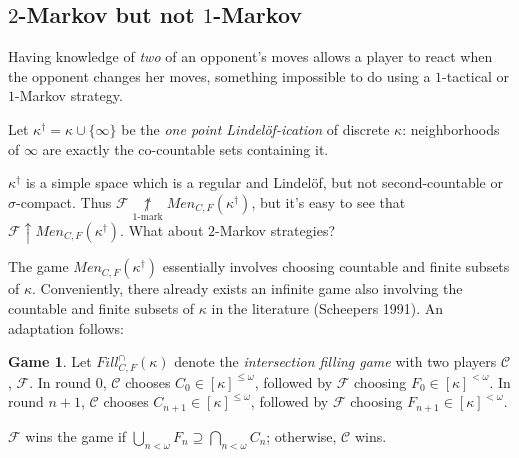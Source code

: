 \documentclass{beamer}
\theoremstyle{definition}
\newtheorem{game}[theorem]{Game}
\newcommand{\win}{\uparrow}
\newcommand{\notkmarkwin}[1]{\underset{#1\text{-mark}}{\not\uparrow}}
\newcommand{\oneptlind}[1]{#1^\dagger}
\newcommand{\mengame}[1]{Men_{C,F}(#1)}
\newcommand{\fillgameInt}[1]{Fill^{\cap}_{C,F}(#1)}
\newcommand{\<}{\langle}
\renewcommand{\>}{\rangle}
\newcommand{\pl}[1]{\mathscr{#1}}
\newcommand{\term}{\textit}
\begin{document}
\subsection{$2$-Markov but not $1$-Markov}

\begin{frame}
  Having knowledge of \textit{two} of an opponent's moves allows a player to
  react when the opponent changes her moves, something impossible to do
  using a $1$-tactical or $1$-Markov strategy.

  \pause

  \begin{definition}
    Let $\oneptlind\kappa = \kappa\cup\{\infty\}$ be the
    \term{one point Lindel\"of-ication} of discrete $\kappa$: neighborhoods
    of $\infty$ are exactly the co-countable sets containing it.
  \end{definition}

  \pause

  $\oneptlind\kappa$ is a simple space which is a regular and Lindel\"of, but
  not second-countable or $\sigma$-compact. Thus
  $\pl F\notkmarkwin{1}\mengame{\oneptlind\kappa}$, but it's easy to see
  that $\pl F\win\mengame{\oneptlind\kappa}$. What about $2$-Markov
  strategies?
\end{frame}

\begin{frame}
  The game $\mengame{\oneptlind\kappa}$ essentially involves choosing
  countable and finite subsets of $\kappa$.
  Conveniently, there already exists an
  infinite game also involving the countable and finite subsets of
  $\kappa$ in the literature (Scheepers 1991). An adaptation follows:

  \pause

  \begin{game}
    Let $\fillgameInt\kappa$ denote the \term{intersection filling game}
    with two players $\pl C$, $\pl F$. In round $0$, $\pl C$ chooses
    $C_0\in[\kappa]^{\leq\omega}$, followed by $\pl F$ choosing
    $F_0\in[\kappa]^{<\omega}$. In round $n+1$, $\pl C$ chooses
    $C_{n+1}\in[\kappa]^{\leq\omega}$, followed
    by $\pl F$ choosing $F_{n+1}\in[\kappa]^{<\omega}$.

    $\pl F$ wins the game if
    $\bigcup_{n<\omega} F_n\supseteq\bigcap_{n<\omega} C_n$; otherwise, $\pl C$
    wins.
  \end{game}
\end{frame}
\end{document}
